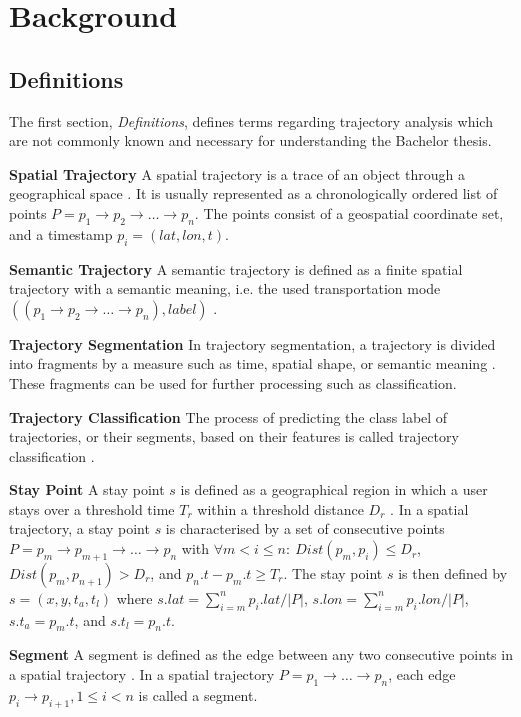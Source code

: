 \chapter{Background}

\section{Definitions}

The first section, \textit{Definitions}, defines terms regarding trajectory analysis which are not commonly known and necessary for understanding the Bachelor thesis. 

\textbf{Spatial Trajectory} A spatial trajectory is a trace of an object through a geographical space  \cite{Zheng:2015:TDM:2764959.2743025}. It is usually represented as a chronologically ordered list of points $ P = p_1\rightarrow p_2 \rightarrow \dots \rightarrow p_n$. The points consist of a geospatial coordinate set, and a timestamp $p_i=(lat,lon,t)$.

\textbf{Semantic Trajectory} A semantic trajectory is defined as a finite spatial trajectory with a semantic meaning, i.e. the used transportation mode $((p_1\rightarrow p_2 \rightarrow \dots \rightarrow p_n), label)$ \cite{Zheng:2015:TDM:2764959.2743025}.

\textbf{Trajectory Segmentation} In trajectory segmentation, a trajectory is divided into fragments by a measure such as time, spatial shape, or semantic meaning \cite{Zheng:2015:TDM:2764959.2743025}. These fragments can be used for further processing such as classification.

\textbf{Trajectory Classification} The process of predicting the class label of trajectories, or their segments, based on their features is called trajectory classification \cite{lee2008traclass}.

\textbf{Stay Point} A stay point $s$ is defined as a geographical region in which a user stays over a threshold time $T_r$ within a threshold distance $D_r$ \cite{Zheng2007}. In a spatial trajectory, a stay point $s$ is characterised by a set of consecutive points $P=p_m \rightarrow p_{m+1} \rightarrow \dots \rightarrow p_n$ with $\forall m<i\leq n:\: Dist(p_m, p_i) \leq D_r$, $Dist(p_m, p_{n+1}) > D_r $, and $p_n.t - p_m.t \geq T_r$. The stay point $s$ is then defined by $s=(x, y, t_a, t_l)$ where $s.lat = \sum^{n}_{i=m}p_i.lat /|P|$, $s.lon = \sum^{n}_{i=m}p_i.lon /|P|$, $s.t_a = p_m.t$, and $s.t_l = p_n.t$.

\textbf{Segment} A segment is defined as the edge between any two consecutive points in a spatial trajectory \cite{Zheng:2015:TDM:2764959.2743025}. In a spatial trajectory $P=p_1 \rightarrow \dots \rightarrow p_n$, each edge $p_i\rightarrow p_{i+1}, 1\leq i < n$ is called a segment.

